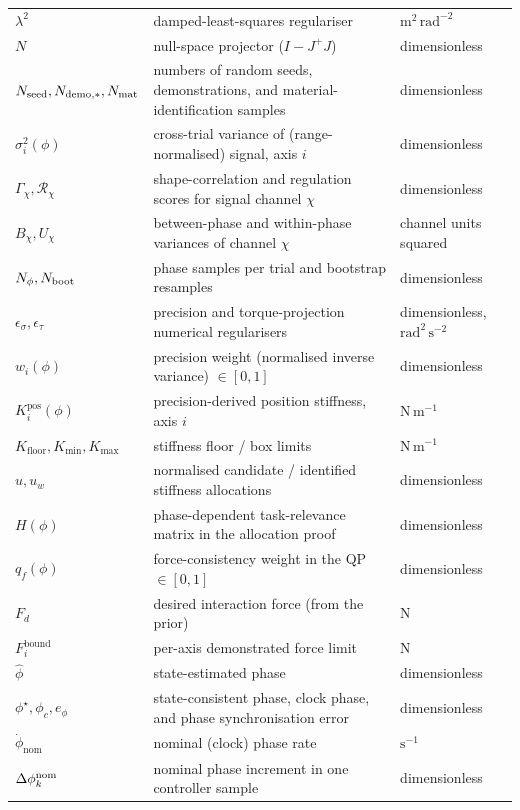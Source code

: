 \documentclass[11pt,a4paper]{article}
\begin{document}
\begin{longtable}{p{3.4cm} p{8.1cm} p{2.6cm}}
$\lambda^2$ & damped-least-squares regulariser & $\mathrm{m^2\,rad^{-2}}$ \\
$N$ & null-space projector ($I-J^{+}J$) & dimensionless \\
$N_{\rm seed},N_{\rm demo,*},N_{\rm mat}$ & numbers of random seeds, demonstrations, and material-identification samples & dimensionless \\
$\sigma_i^2(\phi)$ & cross-trial variance of (range-normalised) signal, axis $i$ & dimensionless \\
$\Gamma_\chi,\mathcal R_\chi$ & shape-correlation and regulation scores for signal channel $\chi$ & dimensionless \\
$B_\chi,U_\chi$ & between-phase and within-phase variances of channel $\chi$ & channel units squared \\
$N_\phi,N_{\rm boot}$ & phase samples per trial and bootstrap resamples & dimensionless \\
$\epsilon_\sigma,\epsilon_\tau$ & precision and torque-projection numerical regularisers & dimensionless, $\mathrm{rad^2\,s^{-2}}$ \\
$w_i(\phi)$ & precision weight (normalised inverse variance) $\in[0,1]$ & dimensionless \\
$K^{\text{pos}}_i(\phi)$ & precision-derived position stiffness, axis $i$ & $\mathrm{N\,m^{-1}}$ \\
$K_{\text{floor}},K_{\min},K_{\max}$ & stiffness floor / box limits & $\mathrm{N\,m^{-1}}$ \\
$u,u_w$ & normalised candidate / identified stiffness allocations & dimensionless \\
$H(\phi)$ & phase-dependent task-relevance matrix in the allocation proof & dimensionless \\
$q_f(\phi)$ & force-consistency weight in the QP $\in[0,1]$ & dimensionless \\
$F_d$ & desired interaction force (from the prior) & $\mathrm{N}$ \\
$F^{\text{bound}}_i$ & per-axis demonstrated force limit & $\mathrm{N}$ \\
$\hat\phi$ & state-estimated phase & dimensionless \\
$\phi^\star,\phi_c,e_\phi$ & state-consistent phase, clock phase, and phase synchronisation error & dimensionless \\
$\dot\phi_{\text{nom}}$ & nominal (clock) phase rate & $\mathrm{s^{-1}}$ \\
$\Delta\phi_k^{\rm nom}$ & nominal phase increment in one controller sample & dimensionless \\

\end{longtable}
\end{document}
